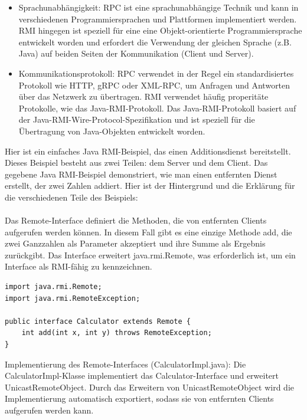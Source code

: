 \begin{itemize} 
\item Sprachunabhängigkeit: RPC ist eine sprachunabhängige Technik und kann in verschiedenen Programmiersprachen und Plattformen implementiert werden. RMI hingegen ist speziell für eine eine Objekt-orientierte Programmiersprache entwickelt worden und erfordert die Verwendung der gleichen Sprache (z.B. Java) auf beiden Seiten der Kommunikation (Client und Server).
\item Kommunikationsprotokoll: RPC verwendet in der Regel ein standardisiertes Protokoll wie HTTP, gRPC oder XML-RPC, um Anfragen und Antworten über das Netzwerk zu übertragen. RMI verwendet häufig properitäte Protokolle, wie das Java-RMI-Protokoll. Das Java-RMI-Protokoll basiert auf der Java-RMI-Wire-Protocol-Spezifikation  und ist speziell für die Übertragung von Java-Objekten entwickelt worden.
\end{itemize} 
Hier ist ein einfaches Java RMI-Beispiel, das einen Additionsdienst bereitstellt. Dieses Beispiel besteht aus zwei Teilen: dem Server und dem Client. Das gegebene Java RMI-Beispiel demonstriert, wie man einen  entfernten Dienst erstellt, der zwei Zahlen addiert. Hier ist der Hintergrund und die Erklärung für die verschiedenen Teile des Beispiels:
\\\\
Das Remote-Interface definiert die Methoden, die von entfernten Clients aufgerufen werden können. In diesem Fall gibt es eine einzige Methode add, die zwei Ganzzahlen als Parameter akzeptiert und ihre Summe als Ergebnis zurückgibt. Das Interface erweitert java.rmi.Remote, was erforderlich ist, um ein Interface als RMI-fähig zu kennzeichnen.

\noindent\begin{minipage}{\textwidth}
\begin{lstlisting}[caption={Remote-Interface (Calculator.java)},captionpos=b,label={lst:rmi-server}]
import java.rmi.Remote;
import java.rmi.RemoteException;

public interface Calculator extends Remote {
    int add(int x, int y) throws RemoteException;
}
\end{lstlisting}
\end{minipage}
Implementierung des Remote-Interfaces (CalculatorImpl.java):
Die CalculatorImpl-Klasse implementiert das Calculator-Interface und erweitert UnicastRemoteObject. Durch das Erweitern von UnicastRemoteObject wird die Implementierung automatisch exportiert, sodass sie von entfernten Clients aufgerufen werden kann.

